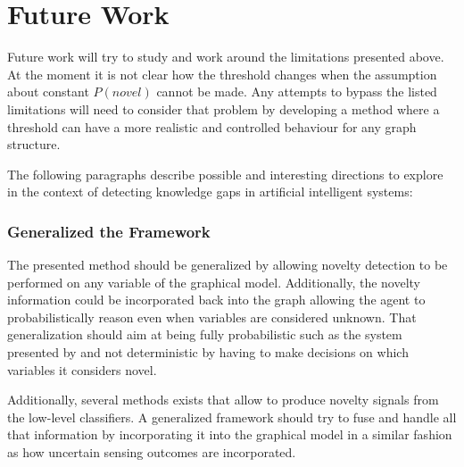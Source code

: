 \section{Future Work}

Future work will try to study and work around the limitations presented above. At the moment
it is not clear how the threshold changes when the assumption about constant $P(novel)$ cannot be
made. Any attempts to bypass the listed limitations will need to consider that problem by 
developing a method where a threshold can have a more realistic and controlled behaviour 
for any graph structure.

The following paragraphs describe possible and interesting directions to explore in the context 
of detecting knowledge gaps in artificial intelligent systems:

\subsubsection*{Generalized the Framework}
The presented method should be generalized by allowing novelty detection to be performed on any 
variable of the graphical model. Additionally, the novelty information could be incorporated back 
into the graph allowing the agent to probabilistically reason even when variables are considered 
unknown. That generalization should aim at being fully probabilistic such as the system presented by
\cite{ranganathan2010pliss} and not deterministic by having to make decisions on which variables
it considers novel.

Additionally, several methods exists that allow to produce novelty signals from the low-level
classifiers. A generalized framework should try to fuse and handle all that information by
incorporating it into the graphical model in a similar fashion as how uncertain sensing outcomes are incorporated.

